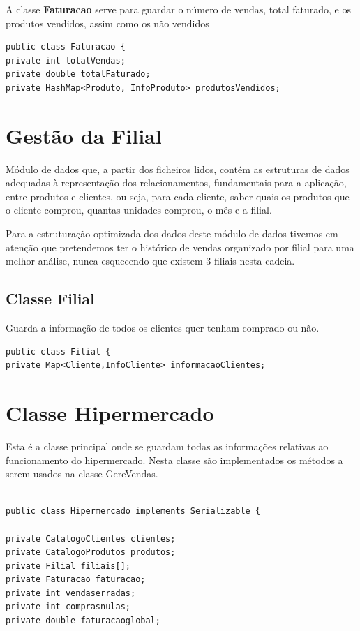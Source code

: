A classe  \color{blue} \textbf{Faturacao} \color{black} serve para guardar o número de vendas, total faturado, e os produtos vendidos, assim como os não vendidos 

\begin{verbatim}
public class Faturacao {
private int totalVendas;
private double totalFaturado;
private HashMap<Produto, InfoProduto> produtosVendidos;
\end{verbatim}



\section{Gestão da Filial}

Módulo de dados que, a partir dos ficheiros lidos, contém as estruturas de dados adequadas à representação dos relacionamentos, fundamentais para a aplicação, entre produtos e clientes, ou seja, para cada cliente, saber quais os produtos que o cliente comprou, quantas unidades comprou, o mês e a filial.

 Para a estruturação optimizada dos dados deste módulo de dados tivemos em atenção que pretendemos ter o histórico de vendas organizado por filial para uma melhor análise, nunca esquecendo que existem 3 filiais nesta cadeia. 

\subsection{Classe Filial}
Guarda a informação de todos os clientes quer tenham comprado ou não. 

\begin{verbatim}
public class Filial {
private Map<Cliente,InfoCliente> informacaoClientes; 
\end{verbatim}

\section{Classe Hipermercado }

Esta é a classe principal onde se guardam todas as informações relativas ao funcionamento do hipermercado. Nesta classe são implementados os métodos a serem usados na classe GereVendas. 

\begin{verbatim}

public class Hipermercado implements Serializable {

private CatalogoClientes clientes;
private CatalogoProdutos produtos;
private Filial filiais[];
private Faturacao faturacao;
private int vendaserradas;
private int comprasnulas;
private double faturacaoglobal;
\end{verbatim}

